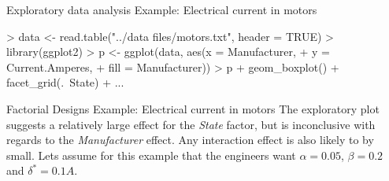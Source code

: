 \documentclass[t]{beamer}
\begin{document}

\begin{ftstf}
{Exploratory data analysis}
{Example: Electrical current in motors}
\begin{rcode}
> data <- read.table("../data files/motors.txt", header = TRUE)
> library(ggplot2)
> p <- ggplot(data, aes(x    = Manufacturer,
+                       y    = Current.Amperes,
+                       fill = Manufacturer))
> p + geom_boxplot() + facet_grid(.~State) + ...
\end{rcode}

\end{ftstf}


\begin{ftst}
{Factorial Designs}
{Example: Electrical current in motors}
The exploratory plot suggests a relatively large effect for the \textit{State} factor, but is inconclusive with regards to the \textit{Manufacturer} effect. Any interaction effect is also likely to by small.
\vhalf
Lets assume for this example that the engineers want $\alpha = 0.05$, $\beta = 0.2$ and $\delta^* = 0.1 A$.
\end{ftst}
\end{document}
